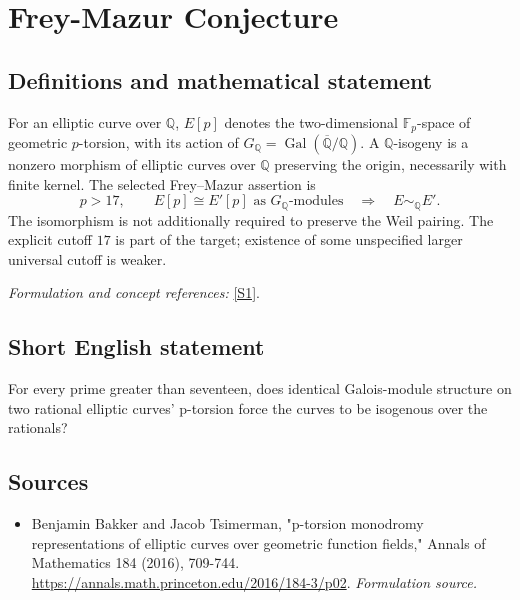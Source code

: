 \documentclass[11pt]{article}
\begin{document}
\section*{\texorpdfstring{Frey-Mazur Conjecture}{Frey-Mazur Conjecture}}\label{statement}
\subsection{Definitions and mathematical statement}
For an elliptic curve over ${\mathbb{Q}}$, $E[p]$ denotes the two-dimensional ${\mathbb{F}}_p$-space of geometric $p$-torsion, with its action of $G_{{\mathbb{Q}}}=\operatorname{Gal}(\overline{{\mathbb{Q}}}/{\mathbb{Q}})$. A ${\mathbb{Q}}$-isogeny is a nonzero morphism of elliptic curves over ${\mathbb{Q}}$ preserving the origin, necessarily with finite kernel. The selected Frey--Mazur assertion is
\[
 p>17,\qquad E[p]\cong E'[p]\text{ as }G_{{\mathbb{Q}}}\text{-modules}
 \quad\Longrightarrow\quad E\sim_{{\mathbb{Q}}}E'.
\]
The isomorphism is not additionally required to preserve the Weil pairing. The explicit cutoff $17$ is part of the target; existence of some unspecified larger universal cutoff is weaker.
\par\smallskip\textit{Formulation and concept references:} \href{https://annals.math.princeton.edu/2016/184-3/p02}{[S1]}.

\subsection{Short English statement}
For every prime greater than seventeen, does identical Galois-module structure on two rational elliptic curves' p-torsion force the curves to be isogenous over the rationals?
\subsection{Sources}
\begin{itemize}
\item[S1]Benjamin Bakker and Jacob Tsimerman, "p-torsion monodromy representations of elliptic curves over geometric function fields," Annals of Mathematics 184 (2016), 709-744.
\url{https://annals.math.princeton.edu/2016/184-3/p02}.
\textit{Formulation source.}
\end{itemize}
\end{document}
